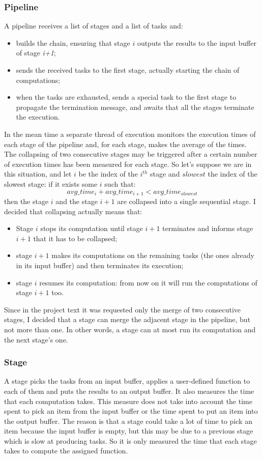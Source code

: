 \documentclass[12pt]{article}
\begin{document}
\subsubsection{Pipeline}
A pipeline receives a list of stages and a list of tasks and:
\begin{itemize}
\item builds the chain, ensuring that stage $i$ outputs the results to the input buffer of stage \textit{i+1};
\item sends the received tasks to the first stage, actually starting the chain of computations;
\item when the tasks are exhausted, sends a special task to the first stage to propagate the termination message, and awaits that all the stages terminate the execution.
\end{itemize}
In the mean time a separate thread of execution monitors the execution times of each stage of the pipeline and, for each stage, makes the average of the times. The collapsing of two consecutive stages may be triggered after a certain number of execution times has been measured for each stage. So let's suppose we are in this situation, and let $i$ be the index of the $i^{th}$ stage and $slowest$ the index of the slowest stage: if it exists some $i$ such that: \[ avg\_time_{i} + avg\_time_{i+1} < avg\_time_{slowest} \] then the stage $i$ and the stage $i+1$ are collapsed into a single sequential stage. I decided that collapsing actually means that:
\begin{itemize}
\item Stage $i$ stops its computation until stage $i+1$ terminates and informs stage $i+1$ that it has to be collapsed; 
\item stage $i+1$ makes its computations on the remaining tasks (the ones already in its input buffer) and then terminates its execution;
\item stage $i$ resumes its computation: from now on it will run the computations of stage $i+1$ too.
\end{itemize}
Since in the project text it was requested only the merge of two consecutive stages, I decided that a stage can merge the adjacent stage in the pipeline, but not more than one. In other words, a stage can at most run its computation and the next stage's one. 

\subsubsection{Stage}
A stage picks the tasks from an input buffer, applies a user-defined function to each of them and puts the results to an output buffer. It also measures the time that each computation takes. This measure does not take into account the time spent to pick an item from the input buffer or the time spent to put an item into the output buffer. The reason is that a stage could take a lot of time to pick an item because the input buffer is empty, but this may be due to a previous stage which is slow at producing tasks. So it is only measured the time that each stage takes to compute the assigned function. 
\end{document}
